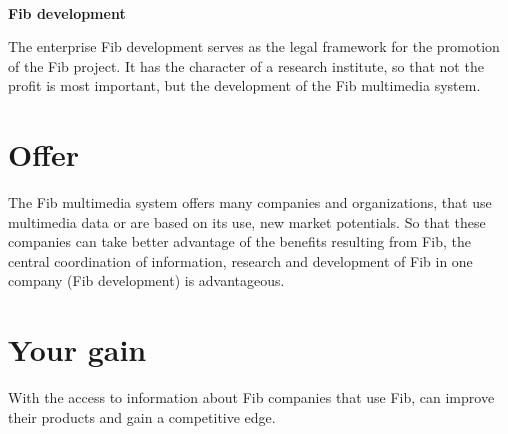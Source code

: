 \documentclass[12pt,a4paper]{article}
\begin{document}






\ \vspace{-2.5cm}
\begin{center}
	\LARGE\bf Fib development\\
\end{center}

\bigskip\noindent
The enterprise Fib development serves as the legal framework for the promotion of the Fib project. It has the character of a research institute, so that not the profit is most important, but the development of the Fib multimedia system.


\section{Offer}

The Fib multimedia system offers many companies and organizations, that use multimedia data or are based on its use, new market potentials. So that these companies can take better advantage of the benefits resulting from Fib, the central coordination of information, research and development of Fib in one company (Fib development) is advantageous.


\section{Your gain}

With the access to information about Fib companies that use Fib, can improve their products and gain a competitive edge.
\end{document}
